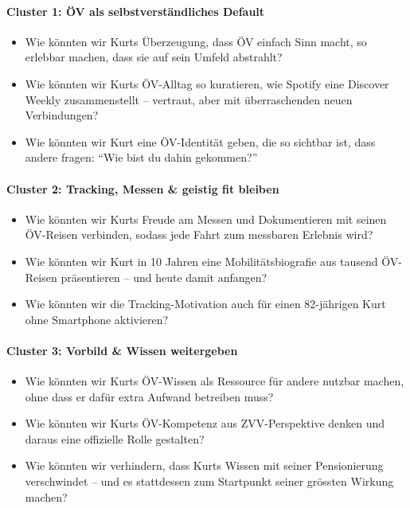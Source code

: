 \paragraph{Cluster 1: ÖV als selbstverständliches Default}
\begin{itemize}[nosep]
  \item Wie könnten wir Kurts Überzeugung, dass ÖV einfach Sinn macht, so erlebbar machen, dass sie auf sein Umfeld abstrahlt?
  \item Wie könnten wir Kurts ÖV-Alltag so kuratieren, wie Spotify eine Discover Weekly zusammenstellt -- vertraut, aber mit überraschenden neuen Verbindungen?
  \item Wie könnten wir Kurt eine ÖV-Identität geben, die so sichtbar ist, dass andere fragen: \enquote{Wie bist du dahin gekommen?}
\end{itemize}

\paragraph{Cluster 2: Tracking, Messen \& geistig fit bleiben}
\begin{itemize}[nosep]
  \item Wie könnten wir Kurts Freude am Messen und Dokumentieren mit seinen ÖV-Reisen verbinden, sodass jede Fahrt zum messbaren Erlebnis wird?
  \item Wie könnten wir Kurt in 10 Jahren eine Mobilitätsbiografie aus tausend ÖV-Reisen präsentieren -- und heute damit anfangen?
  \item Wie könnten wir die Tracking-Motivation auch für einen 82-jährigen Kurt ohne Smartphone aktivieren?
\end{itemize}

\paragraph{Cluster 3: Vorbild \& Wissen weitergeben}
\begin{itemize}[nosep]
  \item Wie könnten wir Kurts ÖV-Wissen als Ressource für andere nutzbar machen, ohne dass er dafür extra Aufwand betreiben muss?
  \item Wie könnten wir Kurts ÖV-Kompetenz aus ZVV-Perspektive denken und daraus eine offizielle Rolle gestalten?
  \item Wie könnten wir verhindern, dass Kurts Wissen mit seiner Pensionierung verschwindet -- und es stattdessen zum Startpunkt seiner grössten Wirkung machen?
\end{itemize}

